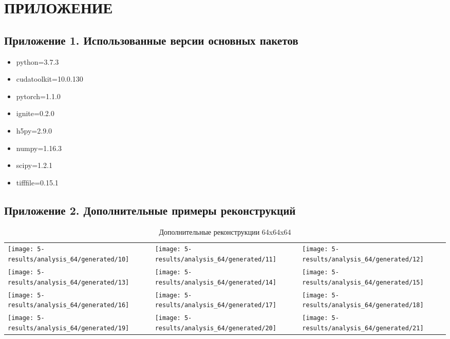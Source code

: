 \clearpage
\section*{\hfil ПРИЛОЖЕНИЕ \hfil}
	\subsection*{Приложение 1. Использованные версии основных пакетов}
		\begin{itemize}
			\item python=3.7.3
			\item cudatoolkit=10.0.130
			\item pytorch=1.1.0
			\item ignite=0.2.0
			\item h5py=2.9.0
			\item numpy=1.16.3
			\item scipy=1.2.1
			\item tifffile=0.15.1
		\end{itemize}
	
	\subsection*{Приложение 2. Дополнительные примеры реконструкций}
		
		\begin{table}[h]
			\centering
			\begin{tabular}{p{5cm} p{5cm} p{5cm}}
				\toprule
				\texttt{[image: 5-results/analysis\_64/generated/10]}
				&
				\texttt{[image: 5-results/analysis\_64/generated/11]}
				&
				\texttt{[image: 5-results/analysis\_64/generated/12]}
				\\
				\texttt{[image: 5-results/analysis\_64/generated/13]}
				&
				\texttt{[image: 5-results/analysis\_64/generated/14]}
				&
				\texttt{[image: 5-results/analysis\_64/generated/15]}
				\\
				\texttt{[image: 5-results/analysis\_64/generated/16]}
				&
				\texttt{[image: 5-results/analysis\_64/generated/17]}
				&
				\texttt{[image: 5-results/analysis\_64/generated/18]}
				\\
				\texttt{[image: 5-results/analysis\_64/generated/19]}
				&
				\texttt{[image: 5-results/analysis\_64/generated/20]}
				&
				\texttt{[image: 5-results/analysis\_64/generated/21]}
				\\
				\bottomrule
			\end{tabular}
			\caption{Дополнительные реконструкции 64x64x64}
			\label{8-gen-64}
		\end{table}
	
